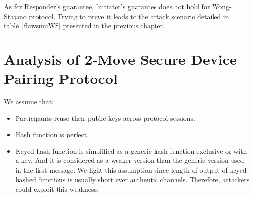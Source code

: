 As for Responder's guarantee, Initiator's guarantee does not hold for Wong-Stajano protocol. Trying to prove it leads to the attack scenario detailed in table~\ref{flawsuniWS} presented in the previous chapter. 



\section{Analysis of 2-Move Secure Device Pairing Protocol}\label{chap42move}

We assume that:
\begin{itemize}
\item Participants reuse their public keys across protocol sessions. 
\item Hash function is perfect. 
\item Keyed hash function is simplified as a generic hash function exclusive-or with a key. And it is considered as a weaker version than the generic version used in the first message. 
We light this assumption since length of output of keyed hashed functions is usually short over authentic channels. Therefore, attackers could exploit this weakness. 
\end{itemize}

